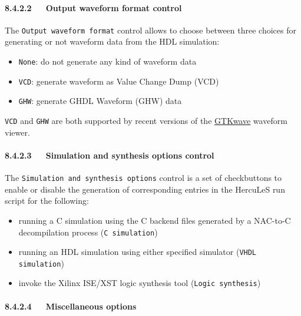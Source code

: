\documentclass[a4paper]{article}
\begin{document}
\paragraph{8.4.2.2~~~Output waveform format control%
  \label{output-waveform-format-control}%
}

The \texttt{Output waveform format} control allows to choose between three choices for generating or not waveform data from the HDL simulation:
%
\begin{itemize}

\item \texttt{None}: do not generate any kind of waveform data

\item \texttt{VCD}: generate waveform as Value Change Dump (VCD)

\item \texttt{GHW}: generate GHDL Waveform (GHW) data

\end{itemize}

\texttt{VCD} and \texttt{GHW} are both supported by recent versions of the \href{http://sourceforge.net/projects/gtkwave}{GTKwave} waveform viewer.


\paragraph{8.4.2.3~~~Simulation and synthesis options control%
  \label{simulation-and-synthesis-options-control}%
}

The \texttt{Simulation and synthesis options} control is a set of checkbuttons to enable or disable the generation of corresponding entries in the HercuLeS run script for the following:
%
\begin{itemize}

\item running a C simulation using the C backend files generated by a NAC-to-C decompilation process (\texttt{C simulation})

\item running an HDL simulation using either specified simulator (\texttt{VHDL simulation})

\item invoke the Xilinx ISE/XST logic synthesis tool (\texttt{Logic synthesis})

\end{itemize}


\paragraph{8.4.2.4~~~Miscellaneous options%
  \label{miscellaneous-options}%
}
\end{document}

